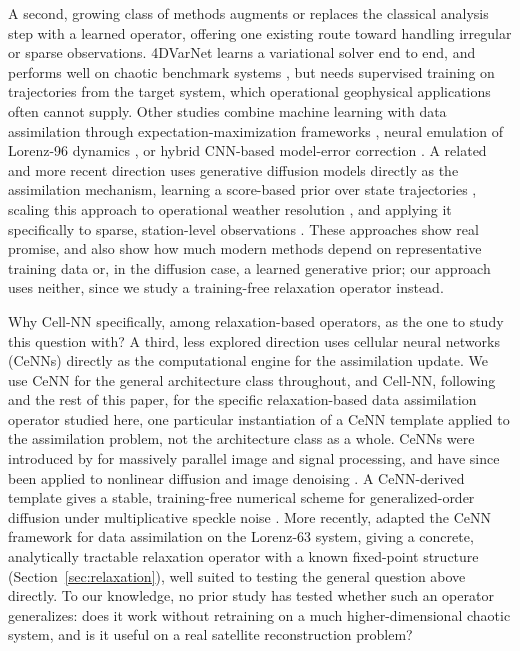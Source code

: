 \documentclass[final,5p,times,twocolumn,authoryear]{elsarticle}
\begin{document}
A second, growing class of methods augments or replaces the classical
analysis step with a learned operator, offering one existing route
toward handling irregular or sparse observations. 4DVarNet learns a
variational solver end to end, and performs well on chaotic benchmark
systems \citep{fablet2021}, but needs supervised training on
trajectories from the target system, which operational geophysical
applications often cannot supply. Other studies combine machine
learning with data assimilation through expectation-maximization
frameworks \citep{bocquet2020}, neural emulation of Lorenz-96 dynamics
\citep{brajard2021}, or hybrid CNN-based model-error correction
\citep{peng2024hybrid}. A related and more recent direction uses
generative diffusion models directly as the assimilation mechanism,
learning a score-based prior over state trajectories
\citep{rozet2023score}, scaling this approach to operational
weather resolution \citep{huang2024diffda}, and applying it
specifically to sparse, station-level observations
\citep{manshausen2025generative}. These approaches show real promise,
and also show how much modern methods depend on representative
training data or, in the diffusion case, a learned generative prior;
our approach uses neither, since we study a training-free
relaxation operator instead.

Why Cell-NN specifically, among relaxation-based operators, as the
one to study this question with? A third, less explored direction
uses cellular neural networks (CeNNs) directly as the computational
engine for the assimilation update. We use CeNN for the general
architecture class throughout, and Cell-NN, following
\citet{magno2025} and the rest of this paper, for the specific
relaxation-based data assimilation operator studied here, one
particular instantiation of a CeNN template applied to the
assimilation problem, not the architecture class as a whole. CeNNs
were introduced by
\citet{chua1988theory,chua1988applications} for massively parallel
image and signal processing, and have since been applied to
nonlinear diffusion and image denoising
\citep{lakra2020cnn,chedjou2014universal}. A CeNN-derived template
gives a stable, training-free numerical scheme for generalized-order
diffusion under multiplicative speckle noise \citep{lakra2022cenn}.
More recently, \citet{magno2025} adapted the CeNN framework for data
assimilation on the Lorenz-63 system, giving a concrete, analytically
tractable relaxation operator with a known fixed-point structure
(Section~\ref{sec:relaxation}), well suited to testing the general
question above directly. To our knowledge, no prior study has tested
whether such an operator generalizes: does it work without retraining
on a much higher-dimensional chaotic system, and is it useful on a
real satellite reconstruction problem?
\end{document}
